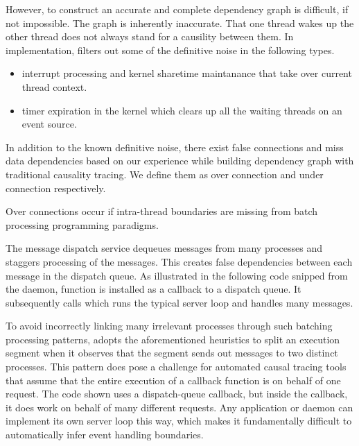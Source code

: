 However, to construct an accurate and complete dependency graph is difficult,
if not impossible. The graph is inherently inaccurate. That one thread wakes
up the other thread does not always stand for a causility between them. In
implementation, \xxx filters out some of the definitive noise in the following
types.


\begin{itemize}

\item interrupt processing and kernel sharetime maintanance that take over
current thread context.

\item timer expiration in the kernel which clears up all the waiting threads on
an event source.

\end{itemize}

In addition to the known definitive noise, there exist false connections and
miss data dependencies based on our experience while building dependency graph
with traditional causality tracing. We define them as over connection and under
connection respectively.

Over connections occur if intra-thread boundaries are missing from batch
processing programming paradigms.

The message dispatch service dequeues messages from many processes and staggers
processing of the messages. This creates false dependencies between each message
in the dispatch queue. As illustrated in the following code snipped from the
 daemon, function  is installed as a callback to
a dispatch queue. It subsequently calls  which runs
the typical server loop and handles many messages.

To avoid incorrectly linking many irrelevant processes through such batching
processing patterns, \xxx adopts the aforementioned heuristics to split an
execution segment when it observes that the segment sends out messages to two
distinct processes. This pattern does pose a challenge for automated causal
tracing tools that assume that the entire execution of a callback function is
on behalf of one request. The code shown uses a dispatch-queue callback, but
inside the callback, it does work on behalf of many different requests. Any
application or daemon can implement its own server loop this way, which makes it
fundamentally difficult to automatically infer event handling boundaries.

